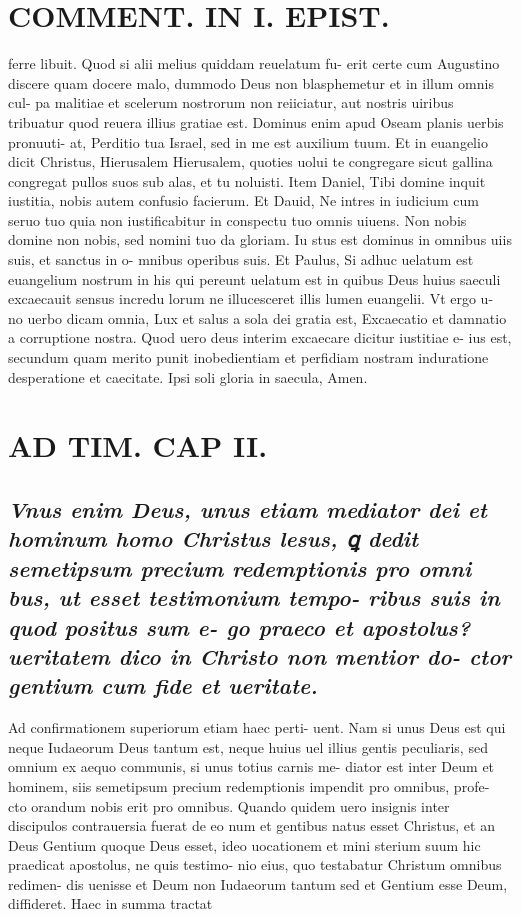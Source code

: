 \documentclass{article}
\begin{document}
\begin{pages}
\section*{COMMENT. IN I. EPIST. }\pstart ferre libuit. Quod si alii melius quiddam reuelatum fu- erit certe cum Augustino discere quam docere malo, dummodo Deus non blasphemetur et in illum omnis cul- pa malitiae et scelerum nostrorum non reiiciatur, aut nostris uiribus tribuatur quod reuera illius gratiae est. Dominus enim apud Oseam planis uerbis pronuuti- at, Perditio tua Israel, sed in me est auxilium tuum. Et in euangelio dicit Christus, Hierusalem Hierusalem, quoties uolui te congregare sicut gallina congregat pullos suos sub alas, et tu noluisti. Item Daniel, Tibi domine inquit iustitia, nobis autem confusio facierum. Et Dauid, Ne intres in iudicium cum seruo tuo quia non iustificabitur in conspectu tuo omnis uiuens. Non nobis domine non nobis, sed nomini tuo da gloriam. Iu stus est dominus in omnibus uiis suis, et sanctus in o- mnibus operibus suis. Et Paulus, Si adhuc uelatum est euangelium nostrum in his qui pereunt uelatum est in quibus Deus huius saeculi excaecauit sensus incredu lorum ne illucesceret illis lumen euangelii. Vt ergo u- no uerbo dicam omnia, Lux et salus a sola dei gratia est, Excaecatio et damnatio a corruptione nostra. Quod uero deus interim excaecare dicitur iustitiae e- ius est, secundum quam merito punit inobedientiam et perfidiam nostram induratione desperatione et caecitate. Ipsi soli gloria in saecula, Amen.  \pend
\section*{AD TIM. CAP II. }
\marginpar{[ p.116 ]}
{}
\subsection*{\textit{Vnus enim Deus, unus etiam mediator dei et hominum homo Christus lesus, ꝗ dedit semetipsum precium redemptionis pro omni bus, ut esset testimonium tempo- ribus suis in quod positus sum e- go praeco et apostolus? ueritatem dico in Christo non mentior do- ctor gentium cum fide et ueritate. }}\pstart Ad confirmationem superiorum etiam haec perti- uent. Nam si unus Deus est qui neque Iudaeorum Deus tantum est, neque huius uel illius gentis peculiaris, sed omnium ex aequo communis, si unus totius carnis me- diator est inter Deum et hominem, siis semetipsum precium redemptionis impendit pro omnibus, profe- cto orandum nobis erit pro omnibus. Quando quidem uero insignis inter discipulos contrauersia fuerat de eo num et gentibus natus esset Christus, et an Deus Gentium quoque Deus esset, ideo uocationem et mini sterium suum hic praedicat apostolus, ne quis testimo- nio eius, quo testabatur Christum omnibus redimen- dis uenisse et Deum non Iudaeorum tantum sed et Gentium esse Deum, diffideret. Haec in summa tractat  \pend

\end{pages}
\end{document}
